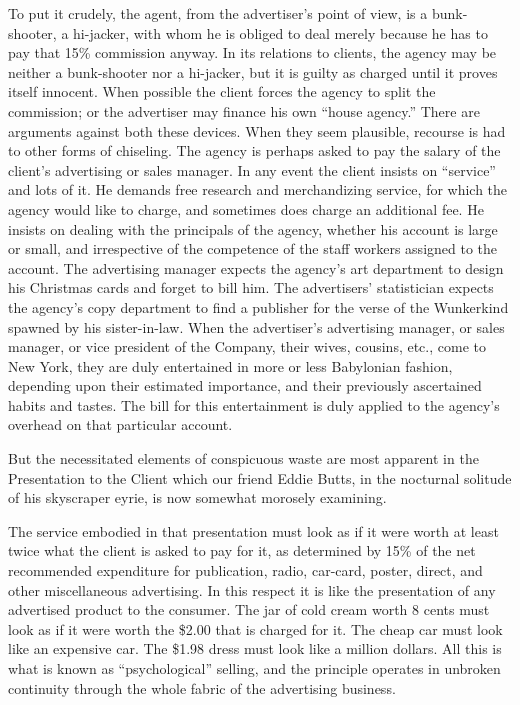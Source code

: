\documentclass[nohyper,openany,nobib]{tufte-book}
\begin{document}
To put it crudely, the agent, from the advertiser's point of view, is a
bunk-shooter, a hi-jacker, with whom he is obliged to deal merely
because he has to pay that 15\% commission anyway. In its relations to
clients, the agency may be neither a bunk-shooter nor a hi-jacker, but
it is guilty as charged until it proves itself innocent. When possible
the client forces the agency to split the commission; or the advertiser
may finance his own ``house agency.'' There are arguments against both
these devices. When they seem plausible, recourse is had to other forms
of chiseling. The agency is perhaps asked to pay the salary of the
client's advertising or sales manager. In any event the client insists
on ``service'' and lots of it. He demands free research and
merchandizing service, for which the agency would like to charge, and
sometimes does charge an additional fee. He insists on dealing with the
principals of the agency, whether his account is large or small, and
irrespective of the competence of the staff workers assigned to the
account. The advertising manager expects the agency's art department to
design his Christmas cards and forget to bill him. The advertisers'
statistician expects the agency's copy department to find a publisher
for the verse of the Wunkerkind spawned by his sister-in-law. When the
advertiser's advertising manager, or sales manager, or vice president of
the Company, their wives, cousins, etc., come to New York, they are duly
entertained in more or less Babylonian fashion, depending upon their
estimated importance, and their previously ascertained habits and
tastes. The bill for this entertainment is duly applied to the agency's
overhead on that particular account.

But the necessitated elements of conspicuous waste are most apparent in
the Presentation to the Client which our friend Eddie Butts, in the
nocturnal solitude of his skyscraper eyrie, is now somewhat morosely
examining.

The service embodied in that presentation must look as if it were worth
at least twice what the client is asked to pay for it, as determined by
15\% of the net recommended expenditure for publication, radio,
car-card, poster, direct, and other miscellaneous advertising. In this
respect it is like the presentation of any advertised product to the
consumer. The jar of cold cream worth 8 cents must look as if it were
worth the \$2.00 that is charged for it. The cheap car must look like an
expensive car. The \$1.98 dress must look like a million dollars. All
this is what is known as ``psychological'' selling, and the principle
operates in unbroken continuity through the whole fabric of the
advertising business.
\end{document}
